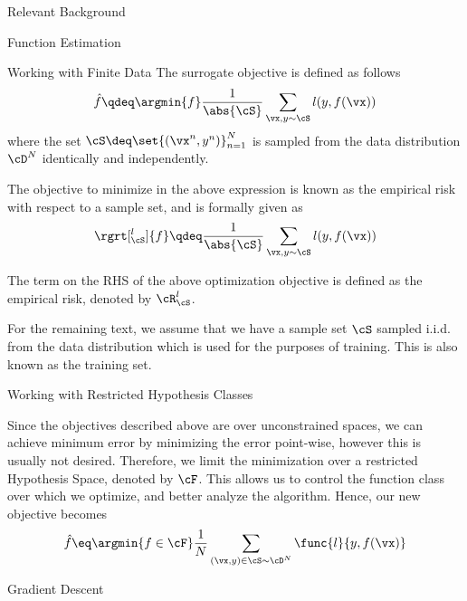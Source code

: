 \documentclass{article}
\begin{document}
\begin{psection}{Relevant Background}
\begin{psubsection}{Function Estimation}
\begin{pssubsection}{Working with Finite Data}
			The surrogate objective is defined as follows
			\begin{align*}
				\hat{f} \qdeq \argmin{f} \frac{1}{\abs{\cS}} \sum_{\vx, y \sim \cS} l(y, f(\vx))
			\end{align*}
			where the set $\cS \deq \set{(\vx^n, y^n)}_{n = 1}^N$ is sampled from the data distribution $\cD^N$ identically and independently.

			The objective to minimize in the above expression is known as the empirical risk with respect to a sample set, and is formally given as
			\begin{align*}
				\rgrt[_\cS^l]{f} \qdeq \frac{1}{\abs{\cS}} \sum_{\vx, y \sim \cS} l(y, f(\vx))
			\end{align*}

			\begin{remark}
				The term on the RHS of the above optimization objective is defined as the empirical risk, denoted by $\cR_\cS^l$.
			\end{remark}

			\begin{note}
				For the remaining text, we assume that we have a sample set $\cS$ sampled i.i.d. from the data distribution which is used for the purposes of training. This is also known as the training set.
			\end{note}

		\end{pssubsection}

		\begin{pssubsection}{Working with Restricted Hypothesis Classes}

			Since the objectives described above are over unconstrained spaces, we can achieve minimum error by minimizing the error point-wise, however this is usually not desired. Therefore, we limit the minimization over a restricted Hypothesis Space, denoted by $\cF$. This allows us to control the function class over which we optimize, and better analyze the algorithm. Hence, our new objective becomes
			\begin{align*}
				\hat{f} \eq \argmin{f \in \cF} \frac{1}{N} \sum_{(\vx, y) \in \cS \sim \cD^N} \func{l}{y, f(\vx)}
			\end{align*}

		\end{pssubsection}

	\end{psubsection}

	\begin{psubsection}{Gradient Descent}


\end{psubsection}
\end{psection}
\end{document}
